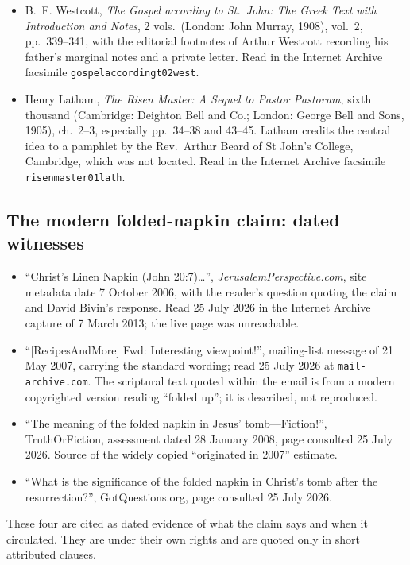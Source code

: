 {\fontsize{8.6}{9.6}\selectfont
\begin{itemize}[itemsep=0pt,parsep=0pt,topsep=0.05em]
\item B.~F. Westcott, \emph{The Gospel according to St.\ John: The Greek Text
with Introduction and Notes}, 2 vols.\ (London: John Murray, 1908), vol.~2,
pp.~339--341, with the editorial footnotes of Arthur Westcott recording his
father's marginal notes and a private letter. Read in the Internet Archive
facsimile \texttt{gospelaccordingt02west}.
\item Henry Latham, \emph{The Risen Master: A Sequel to Pastor Pastorum}, sixth
thousand (Cambridge: Deighton Bell and Co.; London: George Bell and Sons, 1905),
ch.~2--3, especially pp.~34--38 and 43--45. Latham credits the central idea to a
pamphlet by the Rev.\ Arthur Beard of St John's College, Cambridge, which was
not located. Read in the Internet Archive facsimile \texttt{risenmaster01lath}.
\end{itemize}}

\subsection*{The modern folded-napkin claim: dated witnesses}

{\fontsize{8.6}{9.6}\selectfont
\begin{itemize}[itemsep=0pt,parsep=0pt,topsep=0.05em]
\item ``Christ's Linen Napkin (John 20:7)\ldots'', \emph{JerusalemPerspective.com},
site metadata date 7 October 2006, with the reader's question quoting the claim
and David Bivin's response. Read 25 July 2026 in the Internet Archive capture of
7 March 2013; the live page was unreachable.
\item ``[RecipesAndMore] Fwd: Interesting viewpoint!'', mailing-list message of
21 May 2007, carrying the standard wording; read 25 July 2026 at
\texttt{mail-archive.com}. The scriptural text quoted within the email is from a
modern copyrighted version reading ``folded up''; it is described, not
reproduced.
\item ``The meaning of the folded napkin in Jesus' tomb---Fiction!'',
TruthOrFiction, assessment dated 28 January 2008, page consulted 25 July 2026.
Source of the widely copied ``originated in 2007'' estimate.
\item ``What is the significance of the folded napkin in Christ's tomb after the
resurrection?'', GotQuestions.org, page consulted 25 July 2026.
\end{itemize}
These four are cited as dated evidence of what the claim says and when it
circulated. They are under their own rights and are quoted only in short
attributed clauses.}

